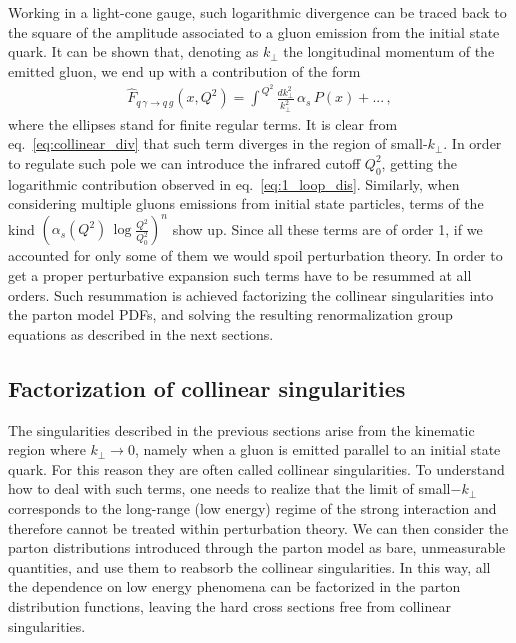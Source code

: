 %
Working in a light-cone gauge, such logarithmic divergence can be traced back to the square of the amplitude associated
to a gluon emission from the initial state quark.
It can be shown that, denoting as $k_{\perp}$ the longitudinal momentum of the emitted gluon,
we end up with a contribution of the form
\begin{align}
    \label{eq:collinear_div}
    \hat{F}_{q\, \gamma \rightarrow q\,g}\left(x,Q^2\right) =
    \int^{\,Q^2}\frac{dk_{\perp}^2}{k_{\perp}^2}\, \alpha_s\, P\left(x\right) + ...\,,
\end{align}
where the ellipses stand for finite regular terms.
It is clear from eq.~\eqref{eq:collinear_div} that such term diverges in the region of small-$k_{\perp}$.
In order to regulate such pole we can introduce the infrared cutoff $Q_0^2$, getting the logarithmic 
contribution observed in eq.~\eqref{eq:1_loop_dis}.
Similarly, when considering multiple gluons emissions from initial state particles, terms of the kind 
$\left(\alpha_s\left(Q^2\right)\,\log\frac{Q^2}{Q_0^2}\right)^n$ show up.
Since all these terms are of order 1, if we accounted for only some of them we would spoil perturbation theory.
In order to get a proper perturbative expansion such terms have to be resummed at all orders.
Such resummation is achieved factorizing the collinear singularities into the parton model PDFs,
and solving the resulting renormalization group equations as described in the next sections.

\subsection{Factorization of collinear singularities}
The singularities described in the previous sections arise from the kinematic region where $k_{\perp}\rightarrow 0$,
namely when a gluon is emitted parallel to an initial state quark. For this reason they are often called collinear
singularities.
To understand how to deal with such terms, one needs to realize that the limit of small$-k_{\perp}$
corresponds to the long-range (low energy) regime of the strong interaction and therefore cannot be treated
within perturbation theory.
We can then consider the parton distributions introduced through the parton model as bare, unmeasurable
quantities, and use them to reabsorb the collinear singularities. In this way, all the dependence on
low energy phenomena can be factorized in the parton distribution functions, leaving the hard
cross sections free from collinear singularities.

